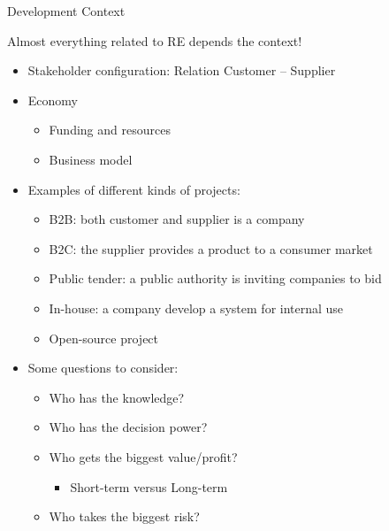 

\begin{Slide}{Development Context}

Almost everything related to RE depends the context!

\begin{itemize}
\item Stakeholder configuration: Relation Customer -- Supplier

\item Economy 
\begin{itemize}
\item Funding and resources
\item Business model

\end{itemize}
\item Examples of different kinds of projects:
\begin{itemize}
\item B2B: both customer and supplier is a company
\item B2C: the supplier provides a product to a consumer market
\item Public tender: a public authority is inviting companies to bid
\item In-house: a company develop a system for internal use
\item Open-source project

\end{itemize}
\item Some questions to consider:
\begin{itemize}
\item Who has the knowledge?
\item Who has the decision power?
\item Who gets the biggest value/profit?
\begin{itemize}
\item Short-term versus Long-term
\end{itemize}
\item Who takes the biggest risk?

\end{itemize}
\end{itemize}
\end{Slide}